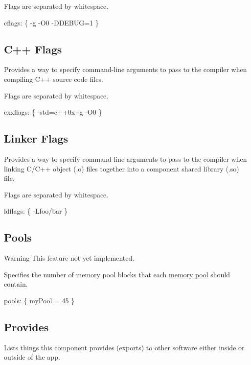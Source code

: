 Flags are separated by whitespace.


\begin{DoxyCode}
cflags:
\{
    -g -O0
    -DDEBUG=1
\}
\end{DoxyCode}
\hypertarget{def_files_cdef_defFilesCdef_cxxFlags}{}\subsection{C++ Flags}\label{def_files_cdef_defFilesCdef_cxxFlags}
Provides a way to specify command-\/line arguments to pass to the compiler when compiling C++ source code files.

Flags are separated by whitespace.


\begin{DoxyCode}
cxxflags:
\{
    -std=c++0x
    -g -O0
\}
\end{DoxyCode}
\hypertarget{def_files_cdef_defFilesCdef_ldFlags}{}\subsection{Linker Flags}\label{def_files_cdef_defFilesCdef_ldFlags}
Provides a way to specify command-\/line arguments to pass to the compiler when linking C/\+C++ object (.o) files together into a component shared library (.so) file.

Flags are separated by whitespace.


\begin{DoxyCode}
ldflags:
\{
    -Lfoo/bar
\}
\end{DoxyCode}
\hypertarget{def_files_cdef_defFilesCdef_pools}{}\subsection{Pools}\label{def_files_cdef_defFilesCdef_pools}
\begin{DoxyWarning}{Warning}
This feature not yet implemented.
\end{DoxyWarning}
Specifies the number of memory pool blocks that each \hyperlink{c_memory}{memory pool} should contain.


\begin{DoxyCode}
pools:
\{
    myPool = 45
\}
\end{DoxyCode}
\hypertarget{def_files_cdef_defFilesCdef_provides}{}\subsection{Provides}\label{def_files_cdef_defFilesCdef_provides}
Lists things this component provides (exports) to other software either inside or outside of the app.

